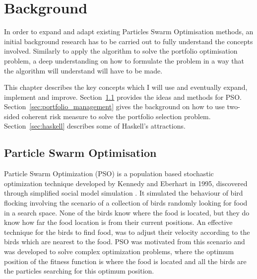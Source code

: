 \chapter{Background}\label{chap:background}
  In order to expand and adapt existing Particles Swarm Optimisation methods, an initial background research has to be carried out to fully understand the concepts involved. Similarly to apply the algorithm to solve the portfolio optimisation problem, a deep understanding on how to formulate the problem in a way that the algorithm will understand will have to be made. 

  This chapter describes the key concepts which I will use and eventually expand, implement and improve. Section~\ref{sec:particle_swarm_optimisation} provides the ideas and methods for PSO. Section~\ref{sec:portfolio_management} gives the background on how to use two-sided coherent risk measure\cite{two_sided_risk} to solve the portfolio selection problem. Section~\ref{sec:haskell} describes some of Haskell's attractions. 


  \section{Particle Swarm Optimisation} %
  \label{sec:particle_swarm_optimisation}


  Particle Swarm Optimization (PSO) is a population based stochastic optimization technique developed by Kennedy and  Eberhart in 1995, discovered through simplified social model simulation \cite{pso,pso2,pso3,pso4}. It simulated the behaviour of bird flocking involving the scenario of a collection of birds randomly looking for food in a search space. None of the birds know where the food is located, but they do know how far the food location is from their current positions. An effective technique for the birds to find food, was to adjust their velocity according to the birds which are nearest to the food. PSO was motivated from this scenario and was developed to solve complex optimization problems, where the optimum position of the fitness function is where the food is located and all the birds are the particles searching for this optimum position. 

